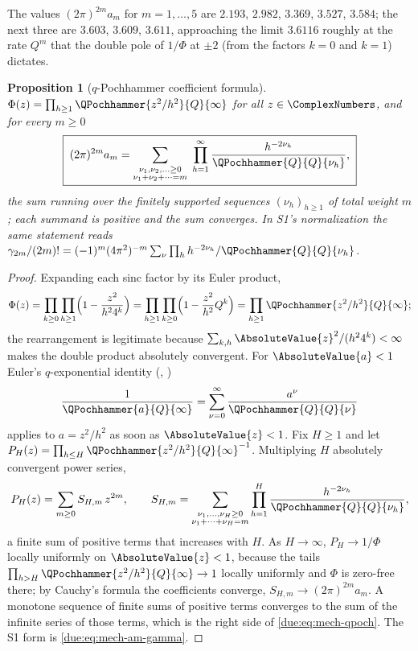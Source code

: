\documentclass[11pt,oneside]{article}
\theoremstyle{plain}
\newtheorem{proposition}[theorem]{Proposition}
\theoremstyle{definition}
\theoremstyle{remark}
\newcommand{\PhiUp}{\Phi}                                   %
\newcommand{\Qq}{Q}                                         %
\newcommand{\am}[1]{a_{#1}}                                 %
\begin{document}
The values \((2\pi)^{2m}\am{m}\) for \(m=1,\ldots,5\) are
\(2.193\), \(2.982\), \(3.369\), \(3.527\), \(3.584\); the next three are
\(3.603\), \(3.609\), \(3.611\), approaching the limit \(3.6116\) roughly at
the rate \(\Qq^{m}\) that the double pole of \(1/\PhiUp\) at \(\pm2\) (from
the factors \(k=0\) and \(k=1\)) dictates.

\begin{proposition}[\(q\)-Pochhammer coefficient formula]
\label{due:prop:mech-qpoch}
\(\PhiUp(z)=\prod_{h\ge1}\QPochhammer{z^{2}/h^{2}}{\Qq}{\infty}\) for all
\(z\in\ComplexNumbers\), and for every \(m\ge0\)
\begin{equation}
 \boxed{\;
 (2\pi)^{2m}\am{m}
 =\sum_{\substack{\nu_1,\nu_2,\ldots\ge0\\ \nu_1+\nu_2+\cdots=m}}
 \;\prod_{h=1}^{\infty}
 \frac{h^{-2\nu_h}}{\QPochhammer{\Qq}{\Qq}{\nu_h}},\;}
 \label{due:eq:mech-qpoch}
\end{equation}
the sum running over the finitely supported sequences \((\nu_h)_{h\ge1}\) of
total weight \(m\); each summand is positive and the sum converges.  In
S1's normalization the same statement reads
\(\gamma_{2m}/(2m)!=(-1)^{m}(4\pi^{2})^{-m}\sum_\nu\prod_hh^{-2\nu_h}/\QPochhammer{\Qq}{\Qq}{\nu_h}\).
\end{proposition}

\begin{proof}
Expanding each sinc factor by its Euler product,
\[
 \PhiUp(z)=\prod_{k\ge0}\prod_{h\ge1}\Bigl(1-\frac{z^{2}}{h^{2}4^{k}}\Bigr)
 =\prod_{h\ge1}\prod_{k\ge0}\Bigl(1-\frac{z^{2}}{h^{2}}\Qq^{k}\Bigr)
 =\prod_{h\ge1}\QPochhammer{z^{2}/h^{2}}{\Qq}{\infty};
\]
the rearrangement is legitimate because
\(\sum_{k,h}\AbsoluteValue{z}^{2}/(h^{2}4^{k})<\infty\) makes the double
product absolutely convergent.  For \(\AbsoluteValue{a}<1\) Euler's
\(q\)-exponential identity (\cite[(1.3.15)]{gasper-rahman}, \cite{dlmf-q})
\[
 \frac1{\QPochhammer{a}{\Qq}{\infty}}
 =\sum_{\nu=0}^{\infty}\frac{a^{\nu}}{\QPochhammer{\Qq}{\Qq}{\nu}}
\]
applies to \(a=z^{2}/h^{2}\) as soon as \(\AbsoluteValue{z}<1\).  Fix
\(H\ge1\) and let \(P_H(z)=\prod_{h\le H}\QPochhammer{z^{2}/h^{2}}{\Qq}{\infty}^{-1}\).
Multiplying \(H\) absolutely convergent power series,
\[
 P_H(z)=\sum_{m\ge0}S_{H,m}\,z^{2m},
 \qquad
 S_{H,m}=\sum_{\substack{\nu_1,\ldots,\nu_H\ge0\\ \nu_1+\cdots+\nu_H=m}}
 \prod_{h=1}^{H}\frac{h^{-2\nu_h}}{\QPochhammer{\Qq}{\Qq}{\nu_h}},
\]
a finite sum of positive terms that increases with \(H\).  As
\(H\to\infty\), \(P_H\to1/\PhiUp\) locally uniformly on
\(\AbsoluteValue{z}<1\), because the tails
\(\prod_{h>H}\QPochhammer{z^{2}/h^{2}}{\Qq}{\infty}\to1\) locally uniformly
and \(\PhiUp\) is zero-free there; by Cauchy's formula the coefficients
converge, \(S_{H,m}\to(2\pi)^{2m}\am{m}\).  A monotone sequence of finite
sums of positive terms converges to the sum of the infinite series of those
terms, which is the right side of \cref{due:eq:mech-qpoch}.  The S1 form is
\cref{due:eq:mech-am-gamma}.
\end{proof}
\end{document}
